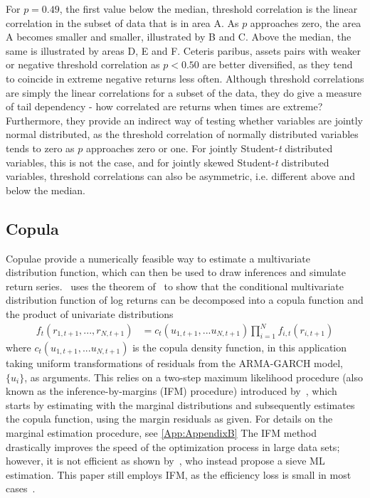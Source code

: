 For $p = 0.49$, the first value below the median, threshold correlation is the linear correlation in the subset of data that is in area A. As $p$ approaches zero, the area A becomes smaller and smaller, illustrated by B and C. Above the median, the same is illustrated by areas D, E and F. Ceteris paribus, assets pairs with weaker or negative threshold correlation as $p < 0.50$ are better diversified, as they tend to coincide in extreme negative returns less often. Although threshold correlations are simply the linear correlations for a subset of the data, they do give a measure of tail dependency - how correlated are returns when times are extreme? Furthermore, they provide an indirect way of testing whether variables are jointly normal distributed, as the threshold correlation of normally distributed variables tends to zero as $p$ approaches zero or one. For jointly Student-\textit{t} distributed variables, this is not the case, and for jointly skewed Student-\textit{t} distributed variables, threshold correlations can also be asymmetric, i.e. different above and below the median.
\subsection{Copula}
Copulae provide a numerically feasible way to estimate a multivariate distribution function, which can then be used to draw inferences and simulate return series.~\textcite{Patton2006} uses the theorem of~\textcite{Sklar1959} to show that the conditional multivariate distribution function of log returns can be decomposed into a copula function and the product of univariate distributions
\begin{align} \label{eq:sklar}
    f_t(r_{1,t+1}, ..., r_{N, t+1}) &= c_t(u_{1, t+1}, ... u_{N, t+1}) \prod^N_{i=1} f_{i,t}(r_{i, t+1})
\end{align}
where $c_t(u_{1, t+1}, ... u_{N, t+1})$ is the copula density function, in this application taking uniform transformations of residuals from the ARMA-GARCH model, $\{u_i\}$, as arguments. This relies on a two-step maximum likelihood procedure (also known as the inference-by-margins (IFM) procedure) introduced by~\textcite{Joe1997}, which starts by estimating with the marginal distributions and subsequently estimates the copula function, using the margin residuals as given. For details on the marginal estimation procedure, see \autoref{App:AppendixB} The IFM method drastically improves the speed of the optimization process in large data sets; however, it is not efficient as shown by~\textcite{ChenFanTsyrennikov2006}, who instead propose a sieve ML estimation. This paper still employs IFM, as the efficiency loss is small in most cases~\autocite{Patton2006}. 

